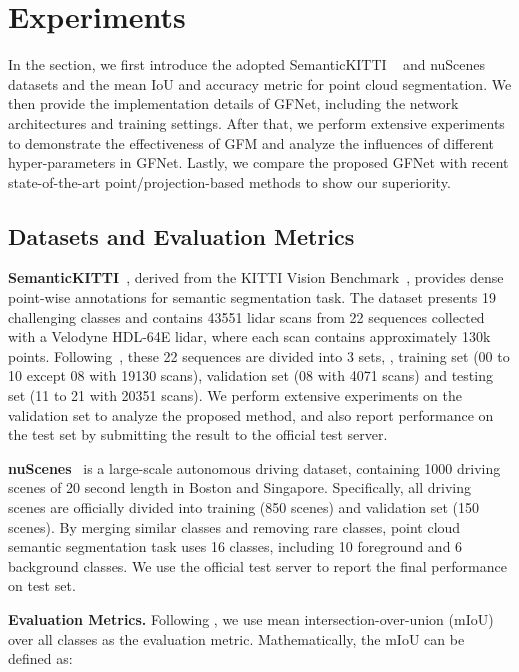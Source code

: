 \section{Experiments}
\label{sec:experiments}
In the section, we first introduce the adopted SemanticKITTI ~\citep{behley2019semantickitti} and nuScenes~\citep{caesar2020nuscenes} datasets and the mean IoU and accuracy metric for point cloud segmentation. We then provide the implementation details of GFNet, including the network architectures and training settings. After that, we perform extensive experiments to demonstrate the effectiveness of GFM and analyze the influences of different hyper-parameters in GFNet. Lastly, we compare the proposed GFNet with recent state-of-the-art point/projection-based methods to show our superiority.






\subsection{Datasets and Evaluation Metrics}
\label{sec:dataset}
\textbf{SemanticKITTI}~\citep{behley2019semantickitti}, derived from the KITTI Vision Benchmark~\citep{geiger2012we}, provides dense point-wise annotations for semantic segmentation task. The dataset presents 19 challenging classes and contains 43551 lidar scans from 22 sequences collected with a Velodyne HDL-64E lidar, where each scan contains approximately 130k points. Following~\cite{behley2019semantickitti,milioto2019rangenet++}, these 22 sequences are divided into 3 sets, \ie, training set (00 to 10 except 08 with 19130 scans), validation set (08 with 4071 scans) and testing set (11 to 21 with 20351 scans). We perform extensive experiments on the validation set to analyze the proposed method, and also report performance on the test set by submitting the result to the official test server. 

\textbf{nuScenes}~\citep{caesar2020nuscenes} is a  large-scale autonomous driving dataset, containing 1000 driving scenes of 20 second length in Boston and Singapore. Specifically, all driving scenes are officially divided into training (850 scenes) and validation set (150 scenes). By merging similar classes and removing rare classes, point cloud semantic segmentation task uses 16 classes, including 10 foreground and 6 background classes. We use the official test server to report the final performance on test set.

\textbf{Evaluation Metrics.}
Following \cite{behley2019semantickitti}, we use mean intersection-over-union (mIoU) over all classes as the evaluation metric. Mathematically, the mIoU can be defined as: 

